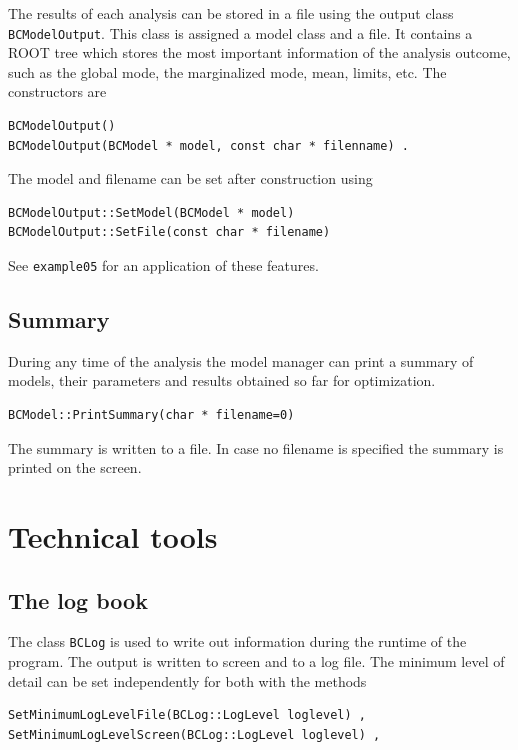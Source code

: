 \documentclass[11pt, a4paper]{article}
\begin{document}
The results of each analysis can be stored in a file using the output
class \verb|BCModelOutput|. This class is assigned a model class and a
file. It contains a ROOT tree which stores the most important
information of the analysis outcome, such as the global mode, the
marginalized mode, mean, limits, etc. The constructors are 
%
\begin{verbatim}
BCModelOutput() 
BCModelOutput(BCModel * model, const char * filenname) .
\end{verbatim}
%
The model and filename can be set after construction using 
%
\begin{verbatim}
BCModelOutput::SetModel(BCModel * model) 
BCModelOutput::SetFile(const char * filename) 
\end{verbatim}
%
See \verb|example05| for an application of these features. 


\subsection{Summary} 

During any time of the analysis the model manager can print a summary
of models, their parameters and results obtained so far for
optimization. 
%
\begin{verbatim}
BCModel::PrintSummary(char * filename=0)
\end{verbatim} 

\noindent 
The summary is written to a file. In case no filename is specified the
summary is printed on the screen. 



\section{Technical tools} 
\label{section:tools} 


\subsection{The log book} 

The class \verb|BCLog| is used to write out information during the
runtime of the program. The output is written to screen and to a log
file. The minimum level of detail can be set independently for both 
with the methods 
%
\begin{verbatim} 
SetMinimumLogLevelFile(BCLog::LogLevel loglevel) , 
SetMinimumLogLevelScreen(BCLog::LogLevel loglevel) , 
\end{verbatim} 
\end{document}
